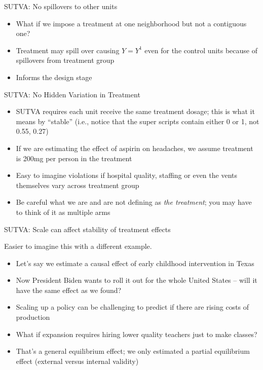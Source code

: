 \documentclass{beamer}
\begin{document}
\begin{frame}{SUTVA: No spillovers to other units}

  \begin{itemize}
    \item What if we impose a treatment at one neighborhood but not a contiguous one?
    \item Treatment may spill over causing $Y=Y^1$ even for the control units because of spillovers from treatment group
    \item Informs the design stage
  \end{itemize}
\end{frame}



\begin{frame}{SUTVA: No Hidden Variation in Treatment}

  \begin{itemize}
    \item SUTVA requires each unit receive the same treatment dosage; this is what it means by ``stable'' (i.e., notice that the super scripts contain either 0 or 1, not 0.55, 0.27)
    \item If we are estimating the effect of aspirin on headaches, we assume treatment is 200mg per person in the treatment
    \item Easy to imagine violations if hospital quality, staffing or even the vents themselves vary across treatment group
    \item Be careful what we are and are not defining as \emph{the treatment}; you may have to think of it as multiple arms
  \end{itemize}
\end{frame}

\begin{frame}{SUTVA: Scale can affect stability of treatment effects}

  Easier to imagine this with a different example.
  \begin{itemize}
    \item Let's say we estimate a causal effect of early childhood intervention in Texas
    \item Now President Biden wants to roll it out for the whole United States -- will it have the same effect as we found?
    \item Scaling up a policy can be challenging to predict if there are rising costs of production
    \item What if expansion requires hiring lower quality teachers just to make classes?
    \item That's a general equilibrium effect; we only estimated a partial equilibrium effect (external versus internal validity)
  \end{itemize}
\end{frame}
% 
\end{document}
